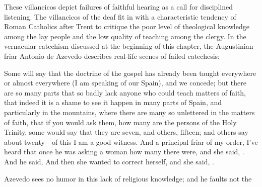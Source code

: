 These villancicos depict failures of faithful hearing as a call for disciplined
listening.
The villancicos of the deaf fit in with a characteristic tendency of Roman
Catholics after Trent to critique the poor level of theological knowledge among
the lay people and the low quality of teaching among the clergy.%
    \Autocite[56--57]{Kamen:EarlyModernSociety}
In the vernacular catechism discussed at the beginning of this chapter, the
Augustinian friar Antonio de Azevedo describes real-life scenes of failed
catechesis: 
\begin{quoting}
    Some will say that the doctrine of the gospel has already been taught
    everywhere or almost everywhere (I am speaking of our Spain), and we
    concede; but there are so many parts that so badly lack anyone who could
    teach matters of faith, that indeed it is a shame to see it happen in many
    parts of Spain, and particularly in the mountains, where there are many so
    unlettered  in the matters of faith, that if you would ask
    them, how many are the persons of the Holy Trinity, some would say that they
    are seven, and others, fifteen; and others say about twenty---of this I am a
    good witness.
    And a principal friar of my order, I've heard that once he was asking a
    woman how many  there were, and she said,
    . 
    And he said,  
    And then she wanted to correct herself, and she said, .%
        \Autocite
        [26: .]
        {Azevedo:Catecismo}
\end{quoting}
Azevedo sees no humor in this lack of religious knowledge; and he faults not the
